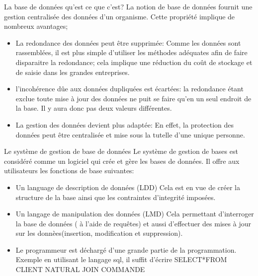 \documentclass{beamer}
\begin{document}
\begin{frame}{La base de donn\'ees qu'est ce que c'est?}
La notion de base de donn\'ees fournit une gestion centralis\'ee des donn\'ees d'un organisme. Cette propri\'et\'e implique de nombreux avantages;
\begin{itemize}
        \item La redondance des donn\'ees peut \^etre supprim\'ee:
        \newline Comme les donn\'ees sont rassembl\'ees, il est plus simple d'utiliser les m\'ethodes ad\'equates afin de faire disparaitre la redondance; cela implique une r\'eduction du co\^ut de stockage et de saisie dans les grandes entreprises.
        \item l'incoh\'erence d\^ue aux donn\'ees dupliqu\'ees est \'ecart\'ees:
        \newline la redondance \'etant exclue toute mise \`a jour des donn\'ees ne puit se faire qu'en un seul endroit de la base. Il y aura donc pas deux valeurs diff\'erentes.
        \item La gestion des donn\'ees devient plus adapt\'ee:
        \newline En effet, la protection des donn\'ees peut \^etre centralis\'ee et mise sous la tutelle d'une unique personne.
    \end{itemize}
    \end{frame}
\begin{frame}{Le syst\`eme de gestion de base de donn\'ees}
Le syst\`eme de gestion de bases est consid\'er\'e comme un logiciel qui cr\'ee et g\`ere les bases de donn\'ees. Il offre aux utilisateurs les fonctions de base suivantes:

    \begin{itemize}
        \item Un language de description de donn\'ees (LDD)
        \newline Cela est en vue de cr\'eer la structure de la base ainsi que les contraintes d'integrit\'e impos\'ees.
        \item Un langage de manipulation des donn\'ees (LMD)
        \newline Cela permettant d'interroger la base de donn\'ees ( \`a l'aide de requ\^etes) et aussi d'effectuer des mises \`a jour sur les donn\`ees(insertion, modification et suppression).
        \item Le programmeur est d\'echarg\'e d'une grande partie de la programmation.
        \newline Exemple en utilisant le langage sql, il suffit d'\'ecrire SELECT*FROM CLIENT NATURAL JOIN COMMANDE 
        \end{itemize}
        \end{frame}
        
\end{document}
